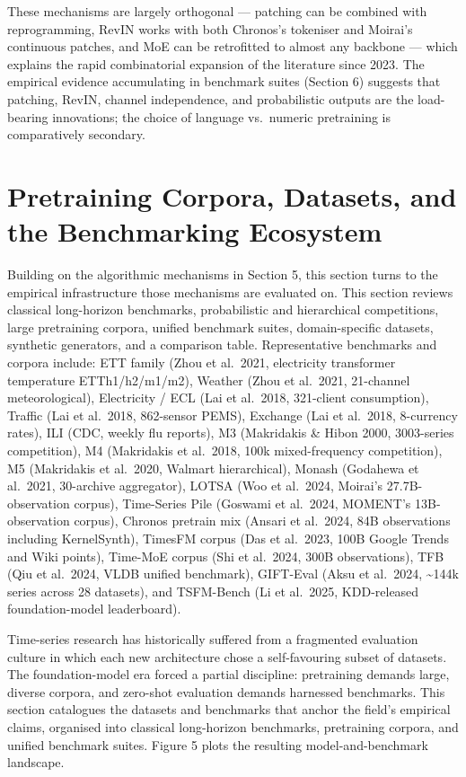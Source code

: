 These mechanisms are largely orthogonal --- patching can be combined with reprogramming, RevIN works with both Chronos's tokeniser and Moirai's continuous patches, and MoE can be retrofitted to almost any backbone --- which explains the rapid combinatorial expansion of the literature since 2023. The empirical evidence accumulating in benchmark suites (Section 6) suggests that patching, RevIN, channel independence, and probabilistic outputs are the load-bearing innovations; the choice of language vs.~numeric pretraining is comparatively secondary.

\section{Pretraining Corpora, Datasets, and the Benchmarking Ecosystem}\label{pretraining-corpora-datasets-and-the-benchmarking-ecosystem}

Building on the algorithmic mechanisms in Section 5, this section turns to the empirical infrastructure those mechanisms are evaluated on. This section reviews classical long-horizon benchmarks, probabilistic and hierarchical competitions, large pretraining corpora, unified benchmark suites, domain-specific datasets, synthetic generators, and a comparison table. Representative benchmarks and corpora include: ETT family (Zhou et al.~2021, electricity transformer temperature ETTh1/h2/m1/m2), Weather (Zhou et al.~2021, 21-channel meteorological), Electricity / ECL (Lai et al.~2018, 321-client consumption), Traffic (Lai et al.~2018, 862-sensor PEMS), Exchange (Lai et al.~2018, 8-currency rates), ILI (CDC, weekly flu reports), M3 (Makridakis \& Hibon 2000, 3003-series competition), M4 (Makridakis et al.~2018, 100k mixed-frequency competition), M5 (Makridakis et al.~2020, Walmart hierarchical), Monash (Godahewa et al.~2021, 30-archive aggregator), LOTSA (Woo et al.~2024, Moirai's 27.7B-observation corpus), Time-Series Pile (Goswami et al.~2024, MOMENT's 13B-observation corpus), Chronos pretrain mix (Ansari et al.~2024, 84B observations including KernelSynth), TimesFM corpus (Das et al.~2023, 100B Google Trends and Wiki points), Time-MoE corpus (Shi et al.~2024, 300B observations), TFB (Qiu et al.~2024, VLDB unified benchmark), GIFT-Eval (Aksu et al.~2024, \textasciitilde144k series across 28 datasets), and TSFM-Bench (Li et al.~2025, KDD-released foundation-model leaderboard).

Time-series research has historically suffered from a fragmented evaluation culture in which each new architecture chose a self-favouring subset of datasets. The foundation-model era forced a partial discipline: pretraining demands large, diverse corpora, and zero-shot evaluation demands harnessed benchmarks. This section catalogues the datasets and benchmarks that anchor the field's empirical claims, organised into classical long-horizon benchmarks, pretraining corpora, and unified benchmark suites. Figure 5 plots the resulting model-and-benchmark landscape.

